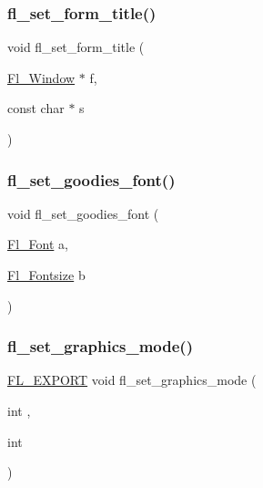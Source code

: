 \mbox{\label{forms_8_h_a8536b922111272533aa54952491683ba}} 
\subsubsection{\texorpdfstring{fl\+\_\+set\+\_\+form\+\_\+title()}{fl\_set\_form\_title()}}
{\footnotesize\ttfamily void fl\+\_\+set\+\_\+form\+\_\+title (\begin{DoxyParamCaption}\item[{\hyperlink{class_fl___window}{Fl\+\_\+\+Window} $\ast$}]{f,  }\item[{const char $\ast$}]{s }\end{DoxyParamCaption})\hspace{0.3cm}{\ttfamily [inline]}}

\mbox{\label{forms_8_h_abc5815b645f52f175c0acdc2581e4e12}} 
\subsubsection{\texorpdfstring{fl\+\_\+set\+\_\+goodies\+\_\+font()}{fl\_set\_goodies\_font()}}
{\footnotesize\ttfamily void fl\+\_\+set\+\_\+goodies\+\_\+font (\begin{DoxyParamCaption}\item[{\hyperlink{_enumerations_8_h_a2ac46d9f082834b969fffe490a03a709}{Fl\+\_\+\+Font}}]{a,  }\item[{\hyperlink{_enumerations_8_h_ad58927f5c691454480f7cd28362502f1}{Fl\+\_\+\+Fontsize}}]{b }\end{DoxyParamCaption})\hspace{0.3cm}{\ttfamily [inline]}}

\mbox{\label{forms_8_h_a6c58c1af7c202464ea8d770293f3aca4}} 
\subsubsection{\texorpdfstring{fl\+\_\+set\+\_\+graphics\+\_\+mode()}{fl\_set\_graphics\_mode()}}
{\footnotesize\ttfamily \hyperlink{_fl___export_8_h_aa9ba29a18aee9d738370a06eeb4470fc}{F\+L\+\_\+\+E\+X\+P\+O\+RT} void fl\+\_\+set\+\_\+graphics\+\_\+mode (\begin{DoxyParamCaption}\item[{int}]{,  }\item[{int}]{ }\end{DoxyParamCaption})}

